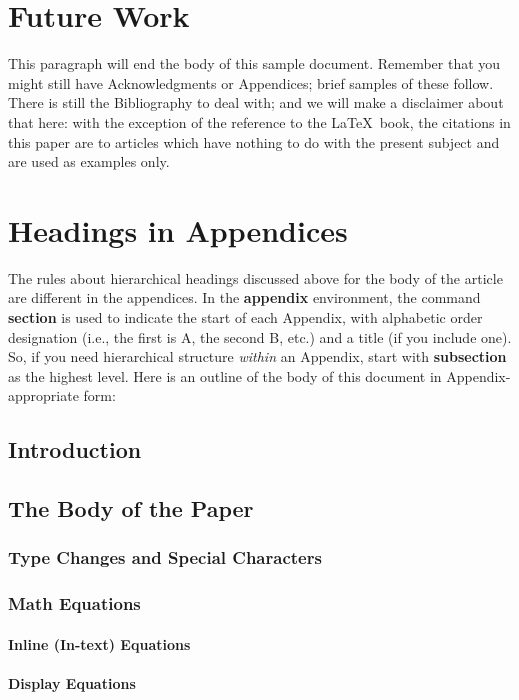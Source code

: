 \section{Future Work}
This paragraph will end the body of this sample document.
Remember that you might still have Acknowledgments or
Appendices; brief samples of these
follow.  There is still the Bibliography to deal with; and
we will make a disclaimer about that here: with the exception
of the reference to the \LaTeX\ book, the citations in
this paper are to articles which have nothing to
do with the present subject and are used as
examples only.



\appendix
\section{Headings in Appendices}
The rules about hierarchical headings discussed above for
the body of the article are different in the appendices.
In the \textbf{appendix} environment, the command
\textbf{section} is used to
indicate the start of each Appendix, with alphabetic order
designation (i.e., the first is A, the second B, etc.) and
a title (if you include one).  So, if you need
hierarchical structure
\textit{within} an Appendix, start with \textbf{subsection} as the
highest level. Here is an outline of the body of this
document in Appendix-appropriate form:
\subsection{Introduction}
\subsection{The Body of the Paper}
\subsubsection{Type Changes and  Special Characters}
\subsubsection{Math Equations}
\paragraph{Inline (In-text) Equations}
\paragraph{Display Equations}
